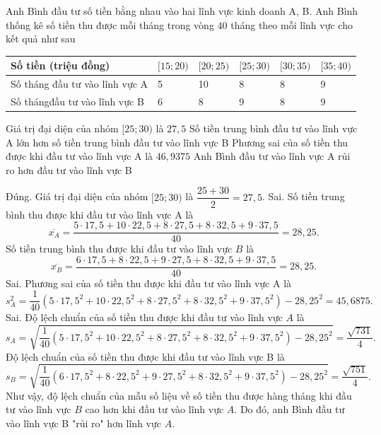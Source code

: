 \begin{ex}%
Anh Bình đầu tư số tiền bằng nhau vào hai lĩnh vực kinh doanh A, B. Anh Bình thống kê số tiền thu được mỗi tháng trong vòng $40$ tháng theo mỗi lĩnh vực cho kết quả như sau
\begin{longtable}{|p{5cm}|p{1.2cm}|p{1.2cm}|p{1.2cm}|p{1.2cm}|p{1.2cm}|}
\hline 
Số tiền (triệu đồng) & {$[15 ; 20)$} & {$[20 ; 25)$} & {$[25 ; 30)$} & {$[30 ; 35)$} & {$[35 ; 40)$} \\
\hline
Số tháng đầu tư vào lĩnh vực A & 5 & 10 & 8 & 8 & 9 \\
\hline 
Số thángđầu tư vào lĩnh vực B & 6 & 8 & 9 & 8 & 9 \\
\hline
\end{longtable}
\choiceTF
{\True Giá trị đại diện của nhóm $[25 ; 30)$ là $27{,}5$}
{Số tiền trung bình đầu tư vào lĩnh vực A lớn hơn số tiền trung bình đầu tư vào lĩnh vực B}
{Phương sai của số tiền thu được khi đầu tư vào lĩnh vực A là $46{,}9375$}
{Anh Bình đầu tư vào lĩnh vực A rủi ro hơn đầu tư vào lĩnh vực B}
\loigiai
{
\begin{itemchoice}
\itemch Đúng. Giá trị đại diện của nhóm $[25 ; 30)$ là $\dfrac{25+30}{2}=27{,}5$.
\itemch Sai. Số tiền trung bình thu được khi đầu tư vào lĩnh vực A là
$$\overline{x_A}=\dfrac{5\cdot 17{,}5+10\cdot 22{,}5+8\cdot 27{,}5+8\cdot 32{,}5+9\cdot 37{,}5}{40}=28{,}25.$$
Số tiền trung bình thu được khi đầu tư vào lĩnh vực $B$ là
$$\overline{x_B}=\dfrac{6\cdot 17{,}5+8\cdot 22{,}5+9\cdot 27{,}5+8\cdot 32{,}5+9\cdot 37{,}5}{40}=28{,}25.$$
\itemch Sai. Phương sai của số tiền thu được khi đầu tư vào lĩnh vực A là
$$s_A^2=\dfrac{1}{40}\left(5\cdot 17{,}5^2+10\cdot 22{,}5^2+8\cdot 27{,}5^2+8\cdot 32{,}5^2+9\cdot 37{,}5^2\right)-28{,}25^2=45{,}6875.$$
\itemch Sai. Độ lệch chuẩn của số tiền thu được khi đầu tư vào lĩnh vực $A$ là
$$s_A=\sqrt{\dfrac{1}{40}\left(5\cdot 17{,}5^2+10\cdot 22{,}5^2+8\cdot 27{,}5^2+8\cdot 32{,}5^2+9\cdot 37{,}5^2\right)-28{,}25^2}=\dfrac{\sqrt{731}}{4}.$$
Độ lệch chuẩn của số tiền thu được khi đầu tư vào lĩnh vực B là
$$s_B=\sqrt{\dfrac{1}{40}\left(6\cdot 17{,}5^2+8\cdot 22{,}5^2+9\cdot 27{,}5^2+8\cdot 32{,}5^2+9\cdot 37{,}5^2\right)-28{,}25^2}=\dfrac{\sqrt{751}}{4}.$$
Như vậy{,} độ lệch chuẩn của mẫu số liệu về số tiền thu được hàng tháng khi đầu tư vào lĩnh vực $B$ cao hơn khi đầu tư vào lĩnh vực $A$. Do đó, anh Bình đầu tư vào lĩnh vực B "rủi ro" hơn lĩnh vực $A$.
\end{itemchoice}
}
\end{ex}

